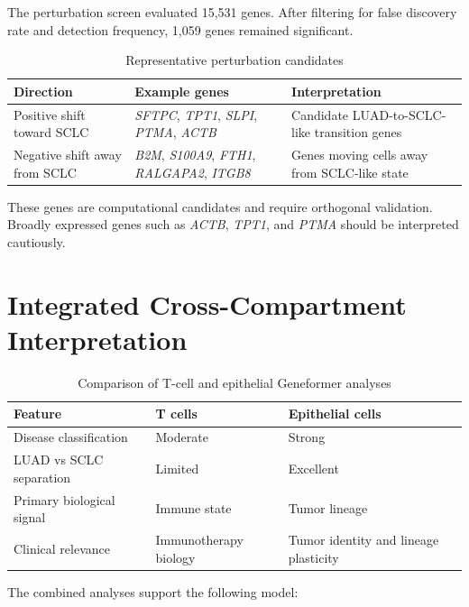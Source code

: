 \documentclass[11pt,a4paper]{article}
\begin{document}
The perturbation screen evaluated 15,531 genes. After filtering for false discovery rate and detection frequency, 1,059 genes remained significant.

\begin{table}[htbp]
\centering
\caption{Representative perturbation candidates}
\begin{tabular}{lll}
\toprule
Direction & Example genes & Interpretation \\
\midrule
Positive shift toward SCLC & \textit{SFTPC}, \textit{TPT1}, \textit{SLPI}, \textit{PTMA}, \textit{ACTB} & Candidate LUAD-to-SCLC-like transition genes \\
Negative shift away from SCLC & \textit{B2M}, \textit{S100A9}, \textit{FTH1}, \textit{RALGAPA2}, \textit{ITGB8} & Genes moving cells away from SCLC-like state \\
\bottomrule
\end{tabular}
\end{table}

These genes are computational candidates and require orthogonal validation. Broadly expressed genes such as \textit{ACTB}, \textit{TPT1}, and \textit{PTMA} should be interpreted cautiously.

\section{Integrated Cross-Compartment Interpretation}

\begin{table}[htbp]
\centering
\caption{Comparison of T-cell and epithelial Geneformer analyses}
\begin{tabular}{lll}
\toprule
Feature & T cells & Epithelial cells \\
\midrule
Disease classification & Moderate & Strong \\
LUAD vs SCLC separation & Limited & Excellent \\
Primary biological signal & Immune state & Tumor lineage \\
Clinical relevance & Immunotherapy biology & Tumor identity and lineage plasticity \\
\bottomrule
\end{tabular}
\end{table}

The combined analyses support the following model:

\begin{center}
\end{center}
\end{document}
